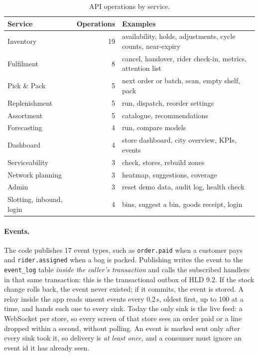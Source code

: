 \begin{table}[ht]
  \centering
  \small
  \begin{tabular}{@{}lrl@{}}
    \toprule
    Service & Operations & Examples \\
    \midrule
    Inventory           & 19 & availability, holds, adjustments, cycle counts, near-expiry \\
    Fulfilment          &  8 & cancel, handover, rider check-in, metrics, attention list \\
    Pick \& Pack        &  5 & next order or batch, scan, empty shelf, pack \\
    Replenishment       &  5 & run, dispatch, reorder settings \\
    Assortment          &  5 & catalogue, recommendations \\
    Forecasting         &  4 & run, compare models \\
    Dashboard           &  4 & store dashboard, city overview, KPIs, events \\
    Serviceability      &  3 & check, stores, rebuild zones \\
    Network planning    &  3 & heatmap, suggestions, coverage \\
    Admin               &  3 & reset demo data, audit log, health check \\
    Slotting, inbound, login & 4 & bins, suggest a bin, goods receipt, login \\
    \bottomrule
  \end{tabular}
  \caption{API operations by service.}
  \label{tab:api}
\end{table}

\paragraph{Events.} The code publishes 17 event types, such as \texttt{order.paid} when a customer pays and
\texttt{rider.assigned} when a bag is packed. Publishing writes the event to the \texttt{event\_log} table
\emph{inside the caller's transaction} and calls the subscribed handlers in that same transaction: this is
the transactional outbox of HLD 9.2. If the stock change rolls back, the event never existed;
if it commits, the event is stored. A relay inside the app reads unsent events every 0.2\,s, oldest first, up to 100
at a time, and hands each one to every sink. Today the only sink is the live feed: a WebSocket per store, so every
screen of that store sees an order paid or a line dropped within a second, without polling. An event is marked sent
only after every sink took it, so delivery is \emph{at least once}, and a consumer must ignore an event id it has
already seen.

